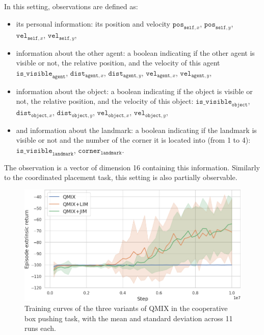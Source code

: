 In this setting, observations are defined as:
\begin{itemize}
    \item its personal information: its position and velocity $\mathtt{pos}_{\mathtt{self},x}$, $\mathtt{pos}_{\mathtt{self},y}$, $\mathtt{vel}_{\mathtt{self},x}$, $\mathtt{vel}_{\mathtt{self},y}$,
    \item information about the other agent: a boolean indicating if the other agent is visible or not, the relative position, and the velocity of this agent $\mathtt{is\_visible}_{\mathtt{agent}}$, $\mathtt{dist}_{\mathtt{agent},x}$, $\mathtt{dist}_{\mathtt{agent},y}$, $\mathtt{vel}_{\mathtt{agent},x}$, $\mathtt{vel}_{\mathtt{agent},y}$,
    \item information about the object: a boolean indicating if the object is visible or not, the relative position, and the velocity of this object: $\mathtt{is\_visible}_{\mathtt{object}}$, $\mathtt{dist}_{\mathtt{object},x}$, $\mathtt{dist}_{\mathtt{object},y}$, $\mathtt{vel}_{\mathtt{object},x}$, $\mathtt{vel}_{\mathtt{object},y}$,
    \item and information about the landmark: a boolean indicating if the landmark is visible or not and the number of the corner it is located into (from 1 to 4): $\mathtt{is\_visible}_{\mathtt{landmark}}$, $\mathtt{corner}_{\mathtt{landmark}}$.
\end{itemize}
The observation is a vector of dimension 16 containing this information. Similarly to the coordinated placement task, this setting is also partially observable. 

\begin{figure}
    \centering
    \includegraphics[width=0.8\linewidth]{Figures/JIM/cooppushR.png}
    \caption{Training curves of the three variants of QMIX in the cooperative box pushing task, with the mean and standard deviation across 11 runs each.}
    \label{fig:JIM:push_results}
\end{figure}

